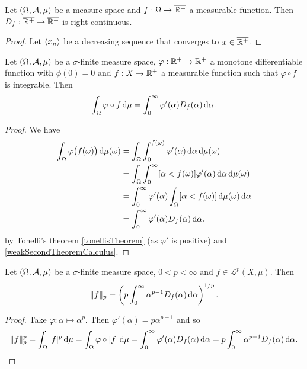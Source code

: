 \begin{lemma}
Let $\left( \Omega, \mathcal{A}, \mu \right)$ be a measure space and $f: \Omega\to \overline{\mathbb{R}^+}$ a measurable function. Then $D_f: \overline{\mathbb{R}^+} \to \overline{\mathbb{R}^+}$ is right-continuous.
\end{lemma}
\begin{proof}
Let $\left\langle x_n \right\rangle$ be a decreasing sequence that converges to $x\in \overline{\mathbb{R}^+}$.
\end{proof}

\begin{proposition}
Let $\left( \Omega, \mathcal{A}, \mu \right)$ be a $\sigma$-finite measure space, $\varphi: \mathbb{R}^+\to \mathbb{R}^+$ a monotone differentiable function with $\phi(0) = 0$ and $f: X\to \mathbb{R}^+$ a measurable function such that $\varphi\circ f$ is integrable. Then
\[ \int_\Omega\varphi\circ f \operatorname{d \!}{\mu} = \int_0^\infty \varphi'(\alpha)D_f(\alpha)\operatorname{d \!}{\alpha}. \]
\end{proposition}
\begin{proof}
We have
\begin{align*}
\int_\Omega\varphi\big(f(\omega)\big) \diff{\mu(\omega)} &= \int_\Omega\int_{0}^{f(\omega)}\varphi'(\alpha)\diff{\alpha} \diff{\mu(\omega)} \\
&= \int_\Omega\int_{0}^{\infty}[\alpha < f(\omega)]\varphi'(\alpha)\diff{\alpha} \diff{\mu(\omega)} \\
&= \int_{0}^{\infty}\varphi'(\alpha)\int_\Omega[\alpha < f(\omega)]\diff{\mu(\omega)}\diff{\alpha} \\
&= \int_{0}^{\infty}\varphi'(\alpha)D_f(\alpha)\diff{\alpha}.
\end{align*}
by Tonelli's theorem \ref{tonellisTheorem} (as $\varphi'$ is positive) and \ref{weakSecondTheoremCalculus}.
\end{proof}
\begin{corollary} \label{LpNormFromDistribution}
Let $\left( \Omega, \mathcal{A}, \mu \right)$ be a $\sigma$-finite measure space, $0<p<\infty$ and $f\in \mathcal{L}^p(X,\mu)$. Then
\[ \lVert f\rVert_p = \left(p\int_0^\infty \alpha^{p-1}D_f(\alpha)\operatorname{d \!}{\alpha}\right)^{1/p}. \]
\end{corollary}
\begin{proof}
Take $\varphi: \alpha\mapsto \alpha^p$. Then $\varphi'(\alpha) = p\alpha^{p-1}$ and so
\[ \lVert f\rVert_p^p = \int_\Omega |f|^p \operatorname{d \!}{\mu} = \int_\Omega \varphi\circ|f| \operatorname{d \!}{\mu} = \int_0^\infty \varphi'(\alpha)D_f(\alpha)\operatorname{d \!}{\alpha} = p\int_0^\infty \alpha^{p-1}D_f(\alpha)\operatorname{d \!}{\alpha}. \]
\end{proof}

